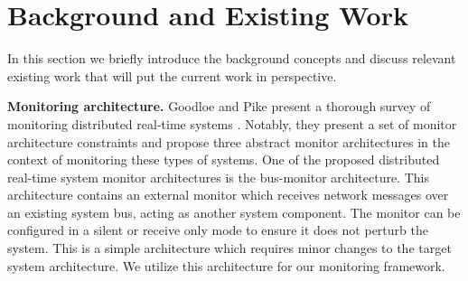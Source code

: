 
\section{Background and Existing Work}
In this section we briefly introduce the background concepts and discuss relevant existing work that will put the current work in perspective.

\vspace*{3pt}
\noindent
\textbf{Monitoring architecture.}
Goodloe and Pike present a thorough survey of monitoring distributed real-time systems  \cite{Goodloe2010}. Notably, they present a set of monitor architecture constraints and propose three abstract monitor architectures in the context of monitoring these types of systems.
%
One of the proposed distributed real-time system monitor architectures is the bus-monitor architecture.
This architecture contains an external monitor which receives network messages over an existing system bus, acting as another system component.
The monitor can be configured in a silent or receive only mode to ensure it does not perturb the system.
This is a simple architecture which requires minor changes to the target system architecture. We utilize this architecture for our monitoring framework.

